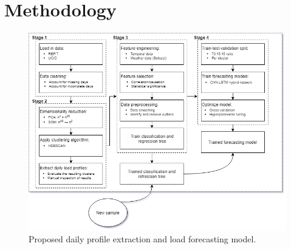 \chapter{Methodology}
\label{ch:Methodology}
\begin{figure}[H]
    \centering
    \includegraphics[width=\textwidth]{Images/Chapter 6/Proposed-Model.png}
    \caption{Proposed daily profile extraction and load forecasting model.}
    \label{fig:Proposed-Model}
\end{figure}